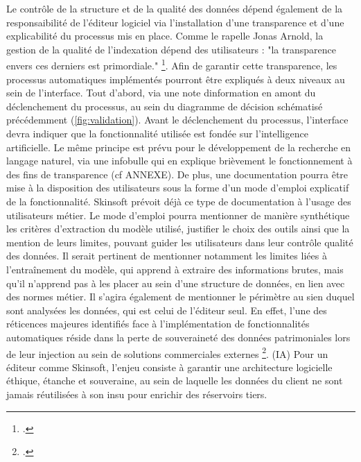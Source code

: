 Le contrôle de la structure et de la qualité des données dépend également de la responsaibilité de l'éditeur logiciel via l'installation d'une transparence et d'une explicabilité du processus mis en place. Comme le rapelle Jonas Arnold, la gestion de la qualité de l'indexation dépend des utilisateurs : "la transparence envers ces derniers est primordiale." \footcite{zotero-item-584}. Afin de garantir cette transparence, les processus automatiques implémentés pourront être expliqués à deux niveaux au sein de l'interface. Tout d'abord, via une note dinformation en amont du déclenchement du processus, au sein du diagramme de décision schématisé précédemment (\ref{fig:validation}). Avant le déclenchement du processus, l'interface devra indiquer que la fonctionnalité utilisée est fondée sur l'intelligence artificielle. Le même principe est prévu pour le développement de la recherche en langage naturel, via une infobulle qui en explique brièvement le fonctionnement à des fins de transparence (cf ANNEXE). De plus, une documentation pourra être mise à la disposition des utilisateurs sous la forme d'un mode d'emploi explicatif de la fonctionnalité. Skinsoft prévoit déjà ce type de documentation à l'usage des utilisateurs métier. Le mode d'emploi pourra mentionner de manière synthétique les critères d'extraction du modèle utilisé, justifier le choix des outils ainsi que la mention de leurs limites, pouvant guider les utilisateurs dans leur contrôle qualité des données. Il serait pertinent de mentionner notamment les limites liées à l'entraînement du modèle, qui apprend à extraire des informations brutes, mais qu'il n'apprend pas à les placer au sein d'une structure de données, en lien avec des normes métier. 
Il s'agira également de mentionner le périmètre au sien duquel sont analysées les données, qui est celui de l'éditeur seul. En effet, l'une des réticences majeures identifiés face à l'implémentation de fonctionnalités automatiques réside dans la perte de souveraineté des données patrimoniales lors de leur injection au sein de solutions commerciales externes \footcite{zotero-item-584}. (IA) Pour un éditeur comme Skinsoft, l'enjeu consiste à garantir une architecture logicielle éthique, étanche et souveraine, au sein de laquelle les données du client ne sont jamais réutilisées à son insu pour enrichir des réservoirs tiers.


